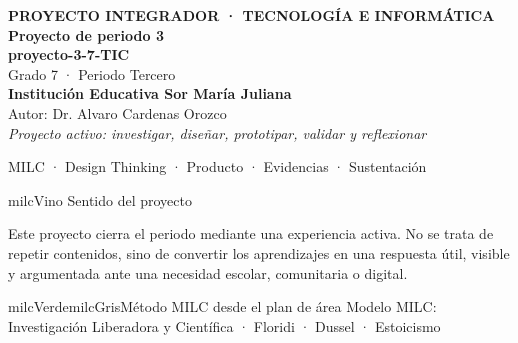 \documentclass[11pt,letterpaper]{article}
\begin{document}
\thispagestyle{empty}

\vspace*{.85cm}
\begin{tcolorbox}[
  enhanced,colback=milcVino,colframe=milcVino,arc=12mm,width=.86\textwidth,
  boxrule=0pt,left=12mm,right=12mm,top=11mm,bottom=11mm,center,
  overlay={\draw[milcMagenta,line width=2pt,dash pattern=on 9pt off 8pt,rounded corners=10mm]
  ([xshift=7mm,yshift=-7mm]frame.north west) rectangle ([xshift=-7mm,yshift=7mm]frame.south east);}]
  \centering
  {\sffamily\bfseries\color{white}\fontsize{15}{17}\selectfont PROYECTO INTEGRADOR · TECNOLOGÍA E INFORMÁTICA}\\[1.0cm]
  {\sffamily\bfseries\color{white}\fontsize{30}{33}\selectfont Proyecto de periodo 3}\\[3mm]
  {\sffamily\bfseries\color{milcMostaza}\fontsize{25}{28}\selectfont proyecto-3-7-TIC}\\[8mm]
  {\sffamily\color{white}\Large Grado 7 · Periodo Tercero}\\[1.0cm]
  {\sffamily\bfseries\color{white}\large Institución Educativa Sor María Juliana}\\[2mm]
  {\sffamily\color{white}Autor: Dr. Alvaro Cardenas Orozco}\\[4mm]
  {\sffamily\itshape\color{white}Proyecto activo: investigar, diseñar, prototipar, validar y reflexionar}
\end{tcolorbox}
\vfill
\begin{tcolorbox}[enhanced,colback=milcVino!72!black,colframe=milcVino!72!black,arc=5mm,boxrule=0pt,width=.86\textwidth,left=6mm,right=6mm,top=4mm,bottom=4mm,center]
{\color{white}\sffamily\small MILC · Design Thinking · Producto · Evidencias · Sustentación}
\end{tcolorbox}

\newpage
\begin{titlebox}{milcVino}
Sentido del proyecto
\end{titlebox}
\begin{multicols}{2}
Este proyecto cierra el periodo mediante una experiencia activa. No se trata de repetir contenidos, sino de convertir los aprendizajes en una respuesta útil, visible y argumentada ante una necesidad escolar, comunitaria o digital.

\columnbreak
\begin{softbox}{milcVerde}{milcGris}{Método MILC desde el plan de área}
Modelo MILC: Investigación Liberadora y Científica · Floridi · Dussel · Estoicismo
\end{softbox}
\end{multicols}
\end{document}

